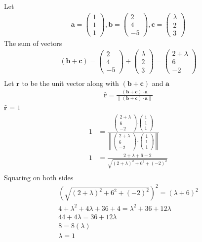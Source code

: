 \documentclass[12pt]{article}
\providecommand{\brak}[1]{\ensuremath{\left(#1\right)}}
\providecommand{\norm}[1]{\left\lVert#1\right\rVert}
\newcommand{\myvec}[1]{\ensuremath{\begin{pmatrix}#1\end{pmatrix}}}
\let\vec\mathbf
\begin{document}
\begin{enumerate}
Let
\begin{align}
\vec{a} = \myvec{1\\1\\1} , \vec{b} = \myvec{2\\4\\-5}, \vec{c} =\myvec{\lambda\\2\\3}
\end{align}
The sum of vectors
\begin{align}
\brak{\vec{b}+\vec{c}} = \myvec{2\\4\\-5}+\myvec{\lambda\\2\\3} = \myvec{2+\lambda\\6\\-2}\\ 
\end{align}
Let $\vec{r}$ to be the unit vector along with $\brak{\vec{b}+\vec{c}}$ and $\vec{a}$\\
\begin{align}
\hat{\vec{r}} =\frac{\brak{\vec{b}+\vec{c}}\cdot\vec{a}}{\norm{\brak{\vec{b}+\vec{c}}\cdot\vec{a}}}
\end{align}
$\hat{\vec{r}}$ = $1$ \\
\begin{align}
	1 &= \frac{\myvec{2+\lambda\\6\\-2}.\myvec{1\\1\\1}}{\norm{\myvec{2+\lambda\\6\\-2}\cdot\myvec{1\\1\\1}}}\\
	1 &= \frac{2+\lambda +6-2}{\sqrt{\brak{2+\lambda}^2 + 6^2 + \brak{-2}^2}}\\
\end{align}
Squaring on both sides\\
\begin{align}
	\brak{\sqrt{\brak{2+\lambda}^2+6^2+\brak{-2}^2}}^2=\brak{\lambda+6}^2\\ 
4+\lambda^2+4\lambda+36+4 = \lambda^2+36+12\lambda\\ 
44+4\lambda = 36+12\lambda\\
8 = 8\brak{\lambda}\\
\lambda = 1
\end{align}
\begin{figure}[!h]

\end{figure}
\end{enumerate}
\end{document}
